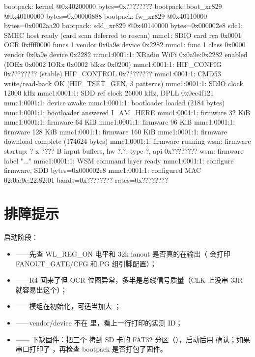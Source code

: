 \begin{txtcode}
bootpack: kernel @0x40200000 bytes=0x????????
bootpack: boot_xr829 @0x40100000 bytes=0x00000888
bootpack: fw_xr829 @0x40110000 bytes=0x0002aa20
bootpack: sdd_xr829 @0x40140000 bytes=0x000002e8
sdc1: SMHC host ready (card scan deferred to rescan)
mmc1: SDIO card rca 0x0001 OCR 0xffff0000 funcs 1 vendor 0x0a9e device 0x2282
mmc1: func 1 class 0x0000 vendor 0x0a9e device 0x2282
mmc1:0001:1: XRadio WiFi 0x0a9e:0x2282 enabled (IOEx 0x0002 IORx 0x0002 blksz 0x0200)
mmc1:0001:1: HIF_CONFIG 0x???????? (stable) HIF_CONTROL 0x????????
mmc1:0001:1: CMD53 write/read-back OK (HIF_TSET_GEN, 3 patterns)
mmc1:0001:1: SDIO clock 12000 kHz
mmc1:0001:1: SDD ref clock 26000 kHz, DPLL 0x0ec4f121
mmc1:0001:1: device awake
mmc1:0001:1: bootloader loaded (2184 bytes)
mmc1:0001:1: bootloader answered I_AM_HERE
mmc1:0001:1: firmware 32 KiB
mmc1:0001:1: firmware 64 KiB
mmc1:0001:1: firmware 96 KiB
mmc1:0001:1: firmware 128 KiB
mmc1:0001:1: firmware 160 KiB
mmc1:0001:1: firmware download complete (174624 bytes)
mmc1:0001:1: firmware running
wsm: firmware startup: ? x ???? B input buffers, hw ?.?, type ?, api 0x????????
wsm: firmware label "..."
mmc1:0001:1: WSM command layer ready
mmc1:0001:1: configure firmware, SDD bytes=0x000002e8
mmc1:0001:1: configured MAC 02:0a:9e:22:82:01 bands=0x???????? rates=0x????????
\end{txtcode}

\section{排障提示}

启动阶段：

\begin{itemize}
  \item {}——先查 WL\_REG\_ON 电平和 32k fanout 是否真的在输出（ 会打印 FANOUT\_GATE/CFG 和 PG 组引脚配置）；
  \item {}——R4 回来了但 OCR 位图异常，多半是总线信号质量（CLK 上没串 33R 就容易出这个）；
  \item {}——模组在初始化，可适当加大 ；
  \item {}——vendor/device 不在  里，看上一行打印的实测 ID；
  \item {}—— 下缺固件：把三个  拷到 SD 卡的 FAT32 分区（），启动后用  确认；如果串口打印了 ，再检查 bootpack 是否打包了固件。
\end{itemize}

